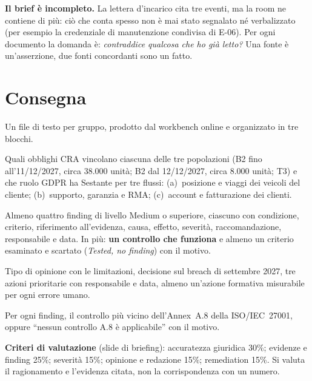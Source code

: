 \begin{esame}
\textbf{Il brief è incompleto.} La lettera d'incarico cita tre eventi, ma la room ne contiene di più:
ciò che conta spesso non è mai stato segnalato né verbalizzato (per esempio la credenziale di
manutenzione condivisa di E-06). Per ogni documento la domanda è: \emph{contraddice qualcosa che ho già
letto?} Una fonte è un'asserzione, due fonti concordanti sono un fatto.
\end{esame}

\section{Consegna}

Un file di testo per gruppo, prodotto dal workbench online e organizzato in tre blocchi.
\begin{description}[style=nextline,leftmargin=1.5em]
  \item[A -- Risposte di scope] Quali obblighi CRA vincolano ciascuna delle tre popolazioni (B2 fino
    all'11/12/2027, circa 38.000 unità; B2 dal 12/12/2027, circa 8.000 unità; T3) e che ruolo GDPR ha
    Sestante per tre flussi: (a)~posizione e viaggi dei veicoli del cliente; (b)~supporto, garanzia e
    RMA; (c)~account e fatturazione dei clienti.
  \item[B -- Registro dei finding] Almeno quattro finding di livello Medium o superiore, ciascuno con
    condizione, criterio, riferimento all'evidenza, causa, effetto, severità, raccomandazione,
    responsabile e data. In più: \textbf{un controllo che funziona} e almeno un criterio esaminato e
    scartato (\emph{Tested, no finding}) con il motivo.
  \item[C -- Opinione e management letter] Tipo di opinione con le limitazioni, decisione sul breach
    di settembre 2027, tre azioni prioritarie con responsabile e data, almeno un'azione formativa
    misurabile per ogni errore umano.
  \item[Bonus] Per ogni finding, il controllo più vicino dell'Annex~A.8 della ISO/IEC~27001, oppure
    ``nessun controllo A.8 è applicabile'' con il motivo.
\end{description}

\noindent\textbf{Criteri di valutazione} (slide di briefing): accuratezza giuridica 30\%; evidenze e
finding 25\%; severità 15\%; opinione e redazione 15\%; remediation 15\%. Si valuta il ragionamento e
l'evidenza citata, non la corrispondenza con un numero.

